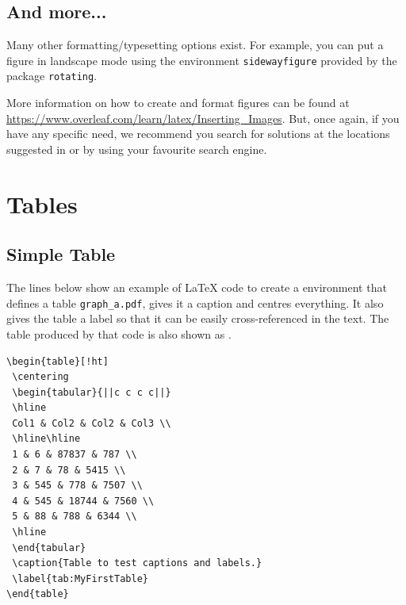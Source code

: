 \documentclass[11pt,twoside,openright]{report}
\begin{document}
\subsection{And more...}
\label{sec:FiguresMore}

Many other formatting/typesetting options exist. 
For example, you can put a figure in landscape mode using the environment \verb|sidewayfigure| provided by the package \verb|rotating|.

More information on how to create and format figures can be found at \url{https://www.overleaf.com/learn/latex/Inserting_Images}.
But, once again, if you have any specific need, we recommend you search for solutions at the locations suggested in  or by using your favourite search engine.



\section{Tables}
\label{sec:Tables}

\subsection{Simple Table}
\label{sec:SimpleTable}

The lines below show an example of \LaTeX{} code to create a  environment that defines a table \verb|graph_a.pdf|, gives it a caption and centres everything.
It also gives the table a label so that it can be easily cross-referenced in the text. The table produced by that code is also shown as .

\begin{verbatim}
\begin{table}[!ht]
 \centering
 \begin{tabular}{||c c c c||} 
 \hline
 Col1 & Col2 & Col2 & Col3 \\
 \hline\hline
 1 & 6 & 87837 & 787 \\ 
 2 & 7 & 78 & 5415 \\
 3 & 545 & 778 & 7507 \\
 4 & 545 & 18744 & 7560 \\
 5 & 88 & 788 & 6344 \\
 \hline
 \end{tabular}
 \caption{Table to test captions and labels.}
 \label{tab:MyFirstTable}
\end{table}
\end{verbatim}
\end{document}
